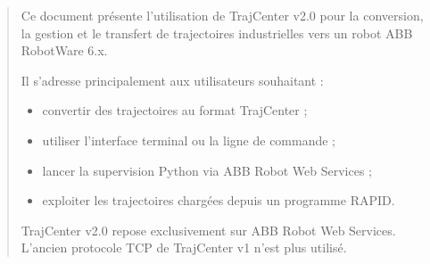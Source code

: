 \documentclass{rapportENSAM}
\begin{document}



\superviseur{}






\fairepagedegarde

\fairemargesintro






\renewcommand{\abstractname}{Avant-propos}
\begin{abstract}
Ce document présente l'utilisation de TrajCenter v2.0 pour la conversion,
la gestion et le transfert de trajectoires industrielles vers un robot ABB
RobotWare 6.x.

Il s'adresse principalement aux utilisateurs souhaitant :
\begin{itemize}
    \item convertir des trajectoires au format TrajCenter ;
    \item utiliser l'interface terminal ou la ligne de commande ;
    \item lancer la supervision Python via ABB Robot Web Services ;
    \item exploiter les trajectoires chargées depuis un programme RAPID.
\end{itemize}

TrajCenter v2.0 repose exclusivement sur ABB Robot Web Services. L'ancien
protocole TCP de TrajCenter v1 n'est plus utilisé.
\end{abstract}

\newpage






\tableofcontents
\newpage


\end{document}
